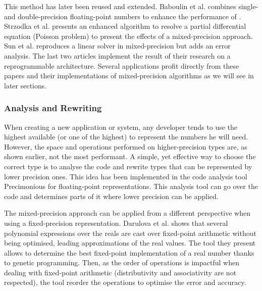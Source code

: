 
This method has later been reused and extended. Baboulin et al. \cite{Baboulin2009} combines single- and double-precision floating-point numbers to enhance the performance of . Strzodka et al. \cite{Strzodka2006} presents an enhanced algorithm to resolve a partial differential equation (Poisson problem) to present the effects of a mixed-precision approach. Sun et al. \cite{Sun2008} reproduces a linear solver in mixed-precision but adds an error analysis. The last two articles implement the result of their research on a reprogrammable architecture. Several applications profit directly from these papers and their implementations of mixed-precision algorithms as we will see in later sections.

\subsubsection{Analysis and Rewriting}

When creating a new application or system, any developer tends to use the highest available (or one of the highest) to represent the numbers he will need. However, the space and operations performed on higher-precision types are, as shown earlier, not the most performant. A simple, yet effective way to choose the correct type is to analyse the code and rewrite types that can be represented by lower precision ones. This idea has been implemented in the code analysis tool Precimonious \cite{Rubio2013} for floating-point representations. This analysis tool can go over the code and determines parts of it where lower precision can be applied.

The mixed-precision approach can be applied from a different perspective when using a fixed-precision representation. Darulova et al. \cite{Darulova2013} shows that several polynomial expressions over the reals are cast over fixed-point arithmetic without being optimised, leading approximations of the real values. The tool they present allows to determine the best fixed-point implementation of a real number thanks to genetic programming. Then, as the order of operations is impactful when dealing with fixed-point arithmetic (distributivity and associativity are not respected), the tool reorder the operations to optimise the error and accuracy.

